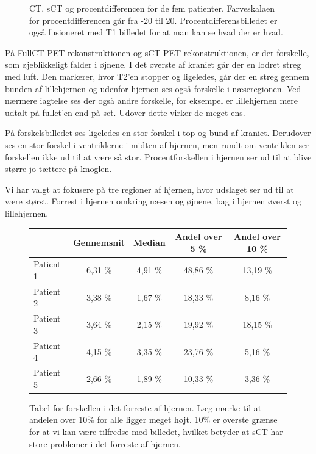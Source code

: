 \begin{figure}
\begin{subfigure}[b]{0.3\textwidth}
        \label{col:loocv_pet_pat5_pd}
    \end{subfigure}
    \caption{CT, sCT og procentdifferencen for de fem patienter. Farveskalaen for procentdifferencen går fra -20 til 20. Procentdifferensbilledet er også fusioneret med T1 billedet for at man kan se hvad der er hvad.}
    \label{col:loocv_pet}
\end{figure}

På FullCT-PET-rekonstruktionen og sCT-PET-rekonstruktionen, er der
forskelle, som øjeblikkeligt falder i øjnene. I det øverste af kraniet
går der en lodret streg med luft. Den markerer, hvor T2'en stopper
og ligeledes, går der en streg gennem bunden af lillehjernen og udenfor
hjernen ses også forskelle i næseregionen. Ved nærmere iagtelse ses
der også andre forskelle, for eksempel er lillehjernen mere udtalt på
fullct'en end på sct. Udover dette virker de meget ens.

På forskelsbilledet ses ligeledes en stor forskel i top og bund af
kraniet. Derudover ses en stor forskel i ventriklerne i midten af
hjernen, men rundt om ventriklen ser forskellen ikke ud til at være så
stor. Procentforskellen i hjernen ser ud til at blive større jo tættere
på knoglen.

Vi har valgt at fokusere på tre regioner af hjernen, hvor udslaget ser ud
til at være størst. Forrest i hjernen omkring næsen og øjnene, bag
i hjernen øverst og lillehjernen.

\begin{figure}
    \centering
    \begin{tabular}{| l | c | c | c | c |}
        \hline
         & Gennemsnit & Median & Andel over 5 \% & Andel over 10 \% \\ \hline
        Patient 1 & 6,31 \% & 4,91 \% & 48,86 \% & 13,19 \% \\ \hline
        Patient 2 & 3,38 \% & 1,67 \% & 18,33 \% & 8,16 \% \\ \hline
        Patient 3 & 3,64 \% & 2,15 \% & 19,92 \% & 18,15 \% \\ \hline
        Patient 4 & 4,15 \% & 3,35 \% & 23,76 \% & 5,16 \% \\ \hline
        Patient 5 & 2,66 \% & 1,89 \% & 10,33 \% & 3,36 \% \\ \hline
    \end{tabular}
    \caption{Tabel for forskellen i det forreste af hjernen. Læg mærke til at andelen over 10\% for alle ligger meget højt. 10\% er øverste grænse for at vi kan være tilfredse med billedet, hvilket betyder at sCT har store problemer i det forreste af hjernen.}
    \label{tab:loocv_forresthjerne}
\end{figure}

